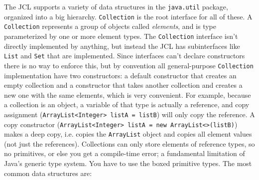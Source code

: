\documentclass[8pt, table, xcdraw]{article}%
\begin{document}
The JCL supports a variety of data structures in the \lstinline{java.util} package, organized into a big hierarchy. \lstinline{Collection} is the root interface for all of these. A \lstinline{Collection} represents a group of objects called \emph{elements}, and is type parameterized by one or more element types. The \lstinline{Collection} interface isn't directly implemented by anything, but instead the JCL has subinterfaces like \lstinline{List} and \lstinline{Set} that are implemented. Since interfaces can't declare constructors there is no way to enforce this, but by convention all general-purpose \lstinline{Collection} implementation have two constructors: a default constructor that creates an empty collection and a constructor that takes another collection and creates a new one with the same elements, which is very convenient. For example, because a collection is an object, a variable of that type is actually a reference, and copy assignment (\lstinline{ArrayList<Integer> listA = listB}) will only copy the reference. A copy constructor (\lstinline{ArrayList<Integer> listA = new ArrayList<>(listB)}) makes a deep copy, i.e. copies the \lstinline{ArrayList} object and copies all element values (not just the references). Collections can only store elements of reference types, so no primitives, or else you get a compile-time error; a fundamental limitation of Java's generic type system. You have to use the boxed primitive types.
The most common data structures are:
\end{document}
